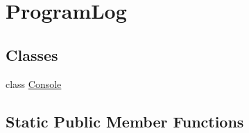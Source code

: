 \hypertarget{classOTA_1_1Logging_1_1ProgramLog}{}\section{Program\+Log}
\label{classOTA_1_1Logging_1_1ProgramLog}
\subsection*{Classes}
\begin{DoxyCompactItemize}
\item 
class \hyperlink{classOTA_1_1Logging_1_1ProgramLog_1_1Console}{Console}
\end{DoxyCompactItemize}
\subsection*{Static Public Member Functions}
